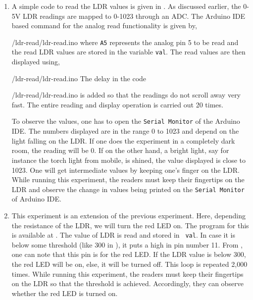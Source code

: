 \begin{enumerate}
  \item A simple code to read the LDR values is given in
        . As discussed earlier, the 0-5V LDR readings
        are mapped to 0-1023 through an ADC. The 
        Arduino IDE
        based command for the analog read functionality is given by,
        
        {\LocLDRardcode/ldr-read/ldr-read.ino} where {\tt A5} represents the
        analog pin 5 to be read and the read LDR values are stored in the
        variable {\tt val}.  The read values are then displayed using,
        
        {\LocLDRardcode/ldr-read/ldr-read.ino} The delay in the code  
        
        {\LocLDRardcode/ldr-read/ldr-read.ino} is added so that the readings
        do not scroll away very fast.  The entire reading and display
        operation is carried out 20 times. 
        
        To observe the values, one has to open the {\tt Serial Monitor} of
        the Arduino IDE.  The numbers displayed are in the range 0 to 1023
        and depend on the light falling on the LDR.  If one does the
        experiment in a completely dark room, the reading will be 0.  If on
        the other hand, a bright light, say for instance the torch light
        from mobile, is shined, the value displayed is close to 1023.  One
        will get intermediate values by keeping one's finger on the LDR. 
        While running this experiment, the readers must keep their fingertips on the LDR and
        observe the change in values being printed on the
          {\tt Serial Monitor} of Arduino IDE.
        
  \item This experiment is an extension of the previous
        experiment. Here, depending the resistance of the LDR, we will
        turn the red LED on.  The program for this is available at
        .  The value of LDR is read and stored in {\tt
            val}.  In case it is below some threshold (like 300 in ), 
        it puts a high in pin number 11.  From , 
        one can note that this pin is for the red LED.  If the LDR value is below 300, 
        the red LED will be on, else, it will be turned off.  
        This loop is repeated 2,000 times. While running this experiment, the readers 
        must keep their fingertips on the LDR so that the threshold is achieved. Accordingly, 
        they can observe whether the red LED is turned on. 
\end{enumerate}

